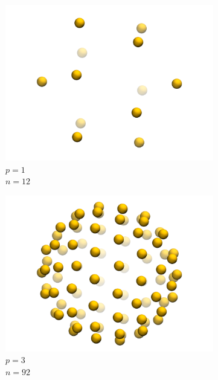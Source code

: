 \documentclass[10pt,a4paper]{report}
\begin{document}
\begin{figure}[!h]
  \begin{subfigure}[t]{0.18\textwidth}
    \center
    \includegraphics[width=\textwidth]{figures/grid_012.png}
    \footnotesize
    $p = 1$ \\
    $n = 12$
  \end{subfigure}
  \begin{subfigure}[t]{0.18\textwidth}
    \center
    \includegraphics[width=\textwidth]{figures/grid_092.png} 
    \footnotesize
    $p = 3$ \\
    $n = 92$
  \end{subfigure}
  \begin{subfigure}[t]{0.18\textwidth}
    \center

\end{subfigure}
\end{figure}
\end{document}
